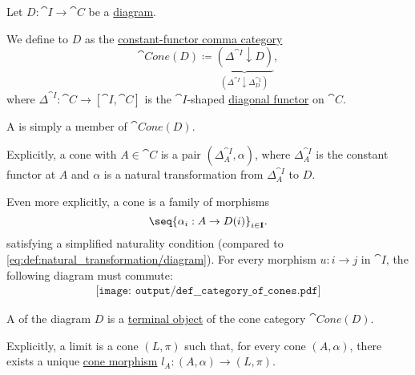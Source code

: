 \begin{definition}\label{def:category_of_cones}
  Let \( D: \cat{I} \to \cat{C} \) be a \hyperref[def:categorical_diagram]{diagram}.

  \begin{thmenum}
     We define  to \( D \) as the \hyperref[def:comma_category/fixed]{constant-functor comma category}
    \begin{equation*}
      \cat{Cone}(D) \coloneqq \underbrace{ (\Delta^{\cat{I}} \downarrow D) }_{(\Delta^{\cat{I}} \downarrow \Delta^{\cat{1}}_{D})},
    \end{equation*}
    where \( \Delta^{\cat{I}}: \cat{C} \to [\cat{I}, \cat{C}] \) is the \( \cat{I} \)-shaped \hyperref[def:diagonal_functor]{diagonal functor} on \( \cat{C} \).

     A  is simply a member of \( \cat{Cone}(D) \).

    Explicitly, a cone with  \( A \in \cat{C} \) is a pair \( (\Delta^{\cat{I}}_A, \alpha) \), where \( \Delta^{\cat{I}}_A \) is the constant functor at \( A \) and \( \alpha \) is a natural transformation from \( \Delta^{\cat{I}}_A \) to \( D \).

    Even more explicitly, a cone is a family of morphisms
    \begin{equation}\label{eq:def:category_of_cones/cone}
      \seq{ \alpha_i: A \to D(i) }_{i \in \cat{I}}.
    \end{equation}
    satisfying a simplified naturality condition (compared to \eqref{eq:def:natural_transformation/diagram}). For every morphism \( u: i \to j \) in \( \cat{I} \), the following diagram must commute:
    \begin{equation}\label{eq:def:category_of_cones/cone_nat}
      \begin{aligned}
        \texttt{[image: output/def\_\_category\_of\_cones.pdf]}
      \end{aligned}
    \end{equation}

     A  of the diagram \( D \) is a \hyperref[def:universal_objects/terminal]{terminal object} of the cone category \( \cat{Cone}(D) \).

    Explicitly, a limit is a cone \( (L, \pi) \) such that, for every cone \( (A, \alpha) \), there exists a unique \hyperref[eq:def:comma_category/fixed]{cone morphism} \( l_A: (A, \alpha) \to (L, \pi) \).


\end{thmenum}
\end{definition}
